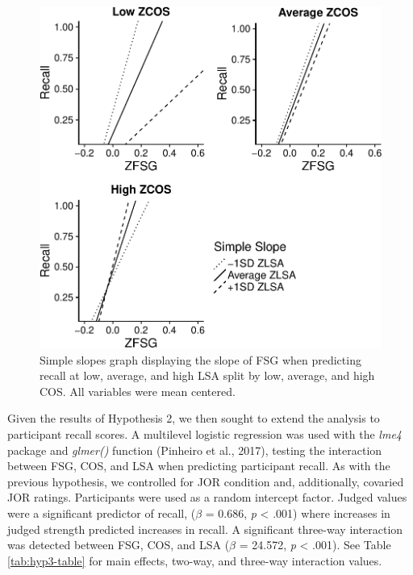 \documentclass[english,man]{apa6}
\theoremstyle{definition}
\theoremstyle{definition}
\theoremstyle{definition}
\theoremstyle{remark}
\begin{document}
\begin{figure}
\centering
\includegraphics{max_buch_JOL_files/figure-latex/hyp3graph-1.pdf}
\caption{\label{fig:hyp3graph}Simple slopes graph displaying the slope of
FSG when predicting recall at low, average, and high LSA split by low,
average, and high COS. All variables were mean centered.}
\end{figure}

Given the results of Hypothesis 2, we then sought to extend the analysis
to participant recall scores. A multilevel logistic regression was used
with the \emph{lme4} package and \emph{glmer()} function (Pinheiro et
al., 2017), testing the interaction between FSG, COS, and LSA when
predicting participant recall. As with the previous hypothesis, we
controlled for JOR condition and, additionally, covaried JOR ratings.
Participants were used as a random intercept factor. Judged values were
a significant predictor of recall, (\(\beta\) = 0.686, \emph{p}
\textless{} .001) where increases in judged strength predicted increases
in recall. A significant three-way interaction was detected between FSG,
COS, and LSA (\(\beta\) = 24.572, \emph{p} \textless{} .001). See Table
\ref{tab:hyp3-table} for main effects, two-way, and three-way
interaction values.
\end{document}
